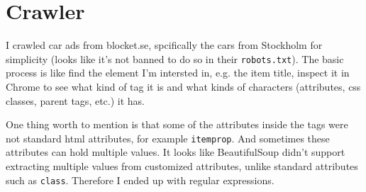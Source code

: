 \documentclass[11pt]{article} %
\begin{document}
\section{Crawler}

I crawled car ads from blocket.se, spcifically the cars from Stockholm for simplicity (looks like it's not banned to do so in their \verb|robots.txt|). The basic process is like find the element I'm intersted in, e.g. the item title, inspect it in Chrome to see what kind of tag it is and what kinds of characters (attributes, css classes, parent tags, etc.) it has.

One thing worth to mention is that some of the attributes inside the tags were not standard html attributes, for example \verb|itemprop|. And sometimes these attributes can hold multiple values. It looks like BeautifulSoup didn't support extracting multiple values from customized attributes, unlike standard attributes such as \verb|class|. Therefore I ended up with regular expressions.
\end{document}
